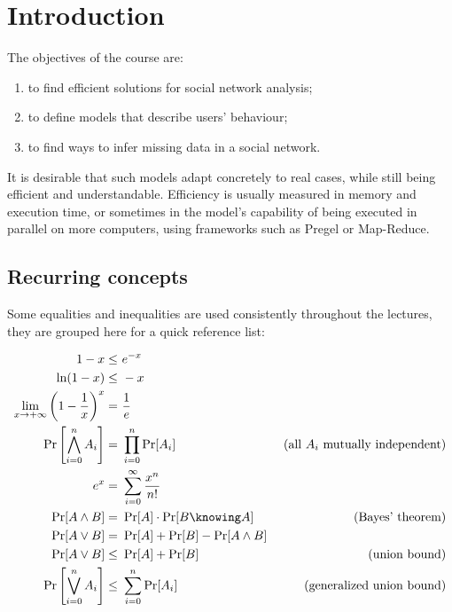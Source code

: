 \chapter{Introduction}
    
The objectives of the course are:
\begin{enumerate}
    \item to find efficient solutions for social network analysis;
    \item to define models that describe users' behaviour;
    \item to find ways to infer missing data in a social network.
\end{enumerate}

It is desirable that such models adapt concretely to real cases, while still being efficient and understandable. Efficiency is usually measured in memory and execution time, or sometimes in the model's capability of being executed in parallel on more computers, using frameworks such as Pregel or Map-Reduce.


\section{Recurring concepts}

Some equalities and inequalities are used consistently throughout the lectures, they are grouped here for a quick reference list: 

\begin{align}
    1 - x \leq&\ e^{-x}                                                 & \label{eq:e-x}                                    \\
    \ln(1 - x) \leq&\ -x                                                & \label{eq:ln-1-x}                                 \\
    \lim_{x \to +\infty} \left(1 - \frac{1}{x}\right)^x =&\ \frac{1}{e} & \label{eq:limit-1/e}                              \\
    \Pr\left[\bigwedge_{i=0}^n A_i\right] =&\ \prod_{i=0}^{n}\Pr[A_i]   & \text{(all } A_i \text{ mutually independent)}    \label{eq:prob} \\
    e^x =&\ \sum_{i = 0}^{\infty} \frac{x^n}{n!}                        & \label{eq:epow}                                   \\
    \Pr[A \wedge B] =&\ \Pr[A] \cdot \Pr[B \knowing A]                  & \tag{Bayes' theorem}                              \label{eq-bayes} \\
    \Pr[A \vee B] =&\ \Pr[A] + \Pr[B] - \Pr[A \wedge B]                 & \label{eq:prob-or}                                \\
    \Pr[A \vee B] \leq&\ \Pr[A] + \Pr[B]                                & \tag{union bound}                                 \label{eq:union-bound} \\
    \Pr\left[\bigvee_{i = 0}^n A_i\right] \leq&\ \sum_{i = 0}^{n}\Pr[A_i]          & \tag{generalized union bound}                     \label{eq:union-bound-gen} \\
\end{align}

